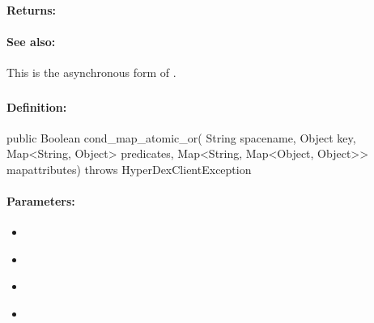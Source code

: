 \paragraph{Returns:}


\paragraph{See also:}  This is the asynchronous form of .

\pagebreak
\subsubsection{}
\label{api:java:cond_map_atomic_or}


\paragraph{Definition:}
\begin{javacode}
public Boolean cond_map_atomic_or(
        String spacename,
        Object key,
        Map<String, Object> predicates,
        Map<String, Map<Object, Object>> mapattributes) throws HyperDexClientException
\end{javacode}

\paragraph{Parameters:}
\begin{itemize}[noitemsep]
\item {}\\

\item {}\\

\item {}\\

\item {}\\

\end{itemize}

